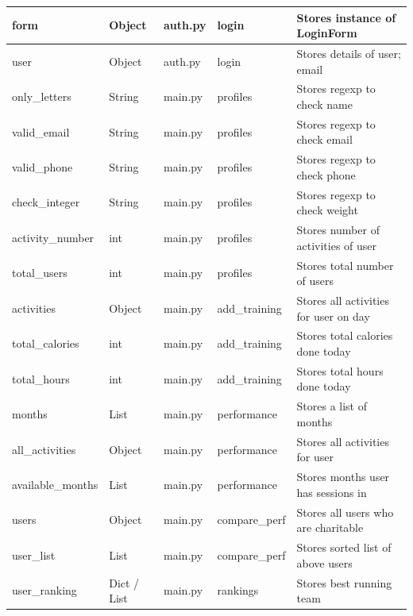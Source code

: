 \documentclass{article}[12pt,a4paper]
\begin{document}
\begin{longtable}{|l|l|l|l|l|}
form              & Object      & auth.py        & login               & Stores instance of LoginForm      \\ \hline
user              & Object      & auth.py        & login               & Stores details of user; email       \\ \hline
only\_letters     & String      & main.py        & profiles            & Stores regexp to check name       \\ \hline
valid\_email      & String      & main.py        & profiles            & Stores regexp to check email      \\ \hline
valid\_phone      & String      & main.py        & profiles            & Stores regexp to check phone      \\ \hline
check\_integer    & String      & main.py        & profiles            & Stores regexp to check weight     \\ \hline
activity\_number  & int         & main.py        & profiles            & Stores number of activities of user \\ \hline
total\_users      & int         & main.py        & profiles            & Stores total number of users        \\ \hline
activities        & Object      & main.py        & add\_training       & Stores all activities for user on day \\ \hline
total\_calories   & int         & main.py        & add\_training       & Stores total calories done today    \\ \hline
total\_hours      & int         & main.py        & add\_training       & Stores total hours done today       \\ \hline
months            & List        & main.py        & performance         & Stores a list of months             \\ \hline
all\_activities   & Object      & main.py        & performance         & Stores all activities for user      \\ \hline
available\_months & List        & main.py        & performance         & Stores months user has sessions in  \\ \hline
users             & Object      & main.py        & compare\_perf       & Stores all users who are charitable \\ \hline
user\_list        & List        & main.py        & compare\_perf       & Stores sorted list of above users   \\ \hline
user\_ranking     & Dict / List & main.py        & rankings            & Stores best running team            \\ \hline

\end{longtable}
\end{document}
